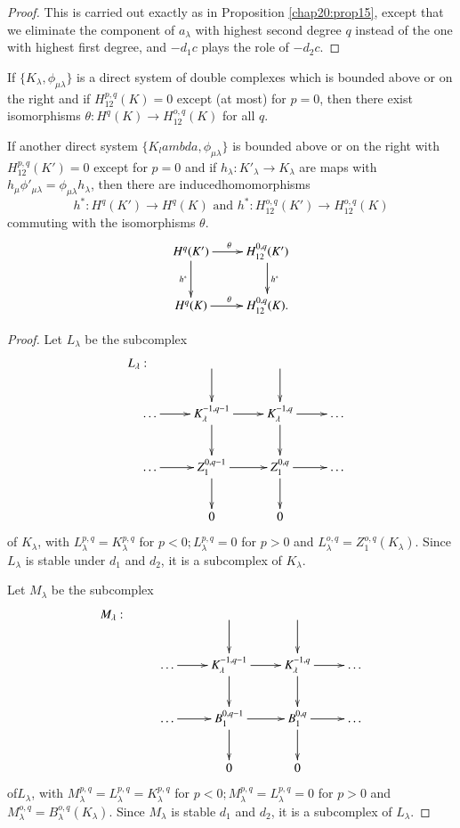  \begin{proof}
This is carried out exactly as in Proposition \ref{chap20:prop15},
except that we 
eliminate the component of $a_\lambda$ with highest second degree $q$
instead of the one with highest first degree, and $-d_1 c$ plays the
role of $-d_2 c$.	 
 \end{proof} 

 \begin{proposition}\label{chap20:prop16}%
 If $\bigg\{ K_\lambda , \phi_{\mu \lambda} \bigg\}$  is a direct
  system of double complexes which is bounded above or on the right
  and if $H^{p,q}_{12} (K) = 0$ except (at most) for $p=0$,  then
  there exist isomorphisms $\theta : H^q(K) \rightarrow
  H^{o,q}_{12}(K)$ for all $q$. 
 
If another direct system $\bigg\{ K_lambda , \phi_{\mu
   \lambda} \bigg\}$ is bounded above or on the right with
 $H^{p,q}_{12}(K') = 0$ except for $p=0$ and if
   $h_{\lambda}: K'_{\lambda} \to K_{\lambda}$ are maps with
 $ h_\mu \phi'_{\mu \lambda} = \phi_{\mu \lambda} h_{\lambda}$, then
there are induced\pageoriginale homomorphisms  
 $$
 h^\ast : H^q (K') \rightarrow H^q(K) \text{ and } h^\ast : H^{o,q}_{12}(K')
 \rightarrow H^{o,q}_{12}(K) 
 $$ 
commuting with the isomorphisms $\theta$. 
\[
\xymatrix{
  H^q(K') \ar[r]^{\theta}\ar[d]_{h^{\ast}} & H^{0,q}_{12}(K')
  \ar[d]^{h^{\ast}}\\
H^q(K) \ar[r]^{\theta} & H^{0,q}_{12}(K).
}
\]
 \end{proposition}


 \begin{proof}
Let $L_\lambda$ be the subcomplex
\[
\xymatrix{
L_{\lambda} :  & \ar[d] & \ar[d] & \\
\qquad  \ldots \ar[r] & K^{-1,q-1}_{\lambda} \ar[d] \ar[r] &
K^{-1,q}_{\lambda} \ar[r] 
\ar[d] & \ldots\\
\qquad  \ldots \ar[r] & Z^{0,q-1}_1 \ar[r]\ar[d] & Z^{0,q}_1\ar[r]\ar[d] &
\ldots\\
 & 0 & 0 & 
}
\]
 of $K_{\lambda}$, with $L^{p,q}_{\lambda} = K^{p,q}_{\lambda}$ for
 $p < 0; L^{p,q}_{\lambda} = 0$ for $p >0$ and $L^{o,q}_{\lambda} =
 Z^{o,q}_1 (K_\lambda)$. Since $L_{\lambda}$ is stable under $d_1$ and
 $d_2$, it is a subcomplex of $K_{\lambda}$. 

 Let $M_\lambda$ be the subcomplex 
\[
\xymatrix{
M_{\lambda} : &  & \ar[d] & \ar[d] & \\
& \ldots \ar[r] & K^{-1,q-1}_{\lambda} \ar[d] \ar[r] &
K^{-1,q}_{\lambda} \ar[r] 
\ar[d] & \ldots\\
&  \ldots \ar[r] & B^{0,q-1}_1 \ar[r]\ar[d] & B^{0,q}_1\ar[r]\ar[d] &
\ldots\\
 & & 0 & 0 & 
}
\]
 of\pageoriginale $L_{\lambda}$, with $M^{p,q}_{\lambda} = L^{p,q}_{\lambda} =
 K^{p,q}_{\lambda}$ for $p < 0; M^{p,q}_{\lambda} = L^{p,q}_{\lambda}
 = 0$ for $p>0$ and $M^{o,q}_{\lambda} =
 B^{o,q}_{\lambda}(K_{\lambda})$. Since $M_{\lambda}$ is stable $d_1$
 and $d_2$, it is a subcomplex of $L_{\lambda}$. 
 \end{proof}

